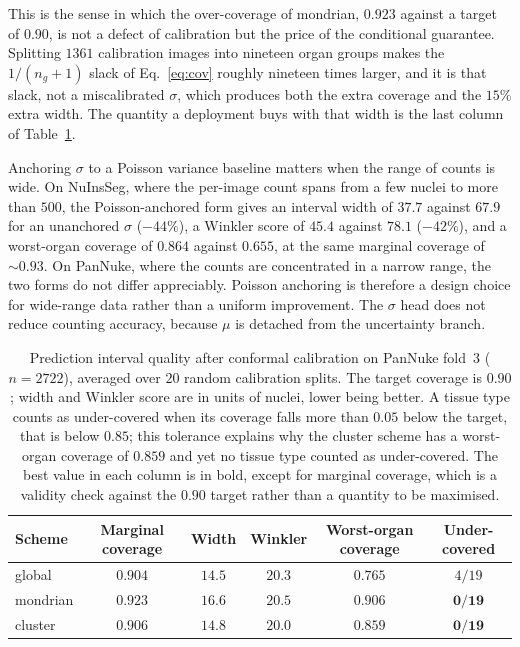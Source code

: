 \documentclass[preprint,12pt]{elsarticle}
\begin{document}
This is the sense in which the over-coverage of mondrian, $0.923$ against a target of $0.90$, is not a defect
of calibration but the price of the conditional guarantee. Splitting $1361$ calibration images into nineteen
organ groups makes the $1/(n_g+1)$ slack of Eq.~\eqref{eq:cov} roughly nineteen times larger, and it is that
slack, not a miscalibrated $\sigma$, which produces both the extra coverage and the $15\%$ extra width. The
quantity a deployment buys with that width is the last column of Table~\ref{tab:uq}.

Anchoring $\sigma$ to a Poisson variance baseline matters when the range of counts is wide. On NuInsSeg, where
the per-image count spans from a few nuclei to more than $500$, the Poisson-anchored form gives an interval
width of $37.7$ against $67.9$ for an unanchored $\sigma$ ($-44\%$), a Winkler score of $45.4$ against $78.1$
($-42\%$), and a worst-organ coverage of $0.864$ against $0.655$, at the same marginal coverage of
${\sim}0.93$. On PanNuke, where the counts are concentrated in a narrow range, the two forms do not differ
appreciably. Poisson anchoring is therefore a design choice for wide-range data rather than a uniform
improvement. The $\sigma$ head does not reduce counting accuracy, because $\mu$ is detached from the
uncertainty branch.

\begin{table}[!htbp]
\centering
\caption{Prediction interval quality after conformal calibration on PanNuke fold~3 ($n=2722$), averaged over
$20$ random calibration splits. The target coverage is $0.90$; width and Winkler score are in units of nuclei,
lower being better. A tissue type counts as under-covered when its coverage falls more than $0.05$ below the
target, that is below $0.85$; this tolerance explains why the cluster scheme has a worst-organ coverage of
$0.859$ and yet no tissue type counted as under-covered. The best value in each column is in bold, except for
marginal coverage, which is a validity check against the $0.90$ target rather than a quantity to be
maximised.}\label{tab:uq}
\footnotesize
\setlength{\tabcolsep}{5pt}
\begin{tabular}{@{}lccccc@{}}
\toprule
Scheme & Marginal coverage & Width & Winkler & Worst-organ coverage & Under-covered \\
\midrule
global & $0.904$ & $\mathbf{14.5}$ & $20.3$ & $0.765$ & $4/19$ \\
mondrian & $0.923$ & $16.6$ & $20.5$ & $\mathbf{0.906}$ & $\mathbf{0/19}$ \\
cluster & $0.906$ & $14.8$ & $\mathbf{20.0}$ & $0.859$ & $\mathbf{0/19}$ \\
\bottomrule
\end{tabular}
\end{table}
\end{document}
